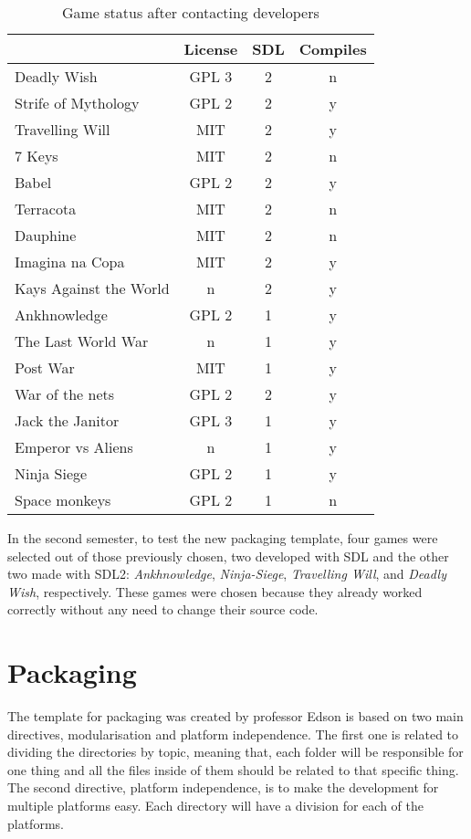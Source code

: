 \begin{table}[h!]
\centering
\caption{Game status after contacting developers}
\label{tab:final_games}
\begin{tabular}{lccc}
\toprule
\textbf{} & \multicolumn{1}{l}{\textbf{License}} & \multicolumn{1}{l}{\textbf{SDL}} & \multicolumn{1}{l}{\textbf{Compiles}} \\
\midrule
Deadly Wish & GPL 3 & 2 & n \\
Strife of Mythology & GPL 2 & 2 & y \\
Travelling Will & MIT & 2 & y \\
7 Keys & MIT & 2 & n \\
Babel & GPL 2 & 2 & y \\
Terracota & MIT & 2 & n \\
Dauphine & MIT & 2 & n \\
Imagina na Copa & MIT & 2 & y \\
Kays Against the World & n & 2 & y \\
Ankhnowledge & GPL 2 & 1 & y \\
The Last World War & n & 1 & y \\
Post War & MIT & 1 & y \\
War of the nets & GPL 2 & 2 & y \\
Jack the Janitor & GPL 3 & 1 & y \\
Emperor vs Aliens & n & 1 & y \\
Ninja Siege & GPL 2 & 1 & y \\
Space monkeys & GPL 2 & 1 & n \\
\bottomrule
\end{tabular}
\end{table}

In the second semester, to test the new packaging template, four games were selected out of those previously chosen, two developed with SDL and the other two made with SDL2: \textit{Ankhnowledge}, \textit{Ninja-Siege}, \textit{Travelling Will}, and \textit{Deadly Wish}, respectively. These games were chosen because they already worked correctly without any need to change their source code.

\section{Packaging}
\label{sec:packaging}

The template for packaging was created by professor Edson is based on two main directives, modularisation and platform independence. The first one is related to dividing the directories by topic, meaning that, each folder will be responsible for one thing and all the files inside of them should be related to that specific thing. The second directive, platform independence, is to make the development for multiple platforms easy. Each directory will have a division for each of the platforms.

